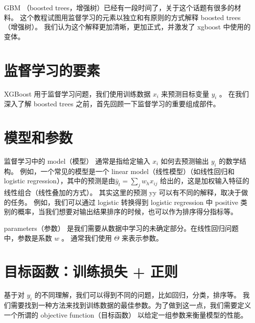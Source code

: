 \documentclass{article}
\begin{document}
GBM （boosted trees，增强树）已经有一段时间了，关于这个话题有很多的材料。 这个教程试图用监督学习的元素以独立和有原则的方式解释 boosted trees （增强树）。 我们认为这个解释更加清晰，更加正式，并激发了 xgboost 中使用的变体。

\section{监督学习的要素}
XGBoost 用于监督学习问题，我们使用训练数据 $x_i$ 来预测目标变量 $y_i$ 。 在我们深入了解 boosted trees 之前，首先回顾一下监督学习的重要组成部件。

\section{模型和参数}
监督学习中的 model（模型） 通常是指给定输入 $x_i$ 如何去预测输出 $y_i$ 的数学结构。 例如，一个常见的模型是一个 linear model（线性模型）（如线性回归和 logistic regression），其中的预测是由$ \hat{y}_t=\sum_j w_hx_{ij}$ 给出的，这是加权输入特征的线性组合（线性叠加的方式）。 其实这里的预测 yy 可以有不同的解释，取决于做的任务。 例如，我们可以通过 logistic 转换得到 logistic regression 中 positive 类别的概率，当我们想要对输出结果排序的时候，也可以作为排序得分指标等。

parameters（参数） 是我们需要从数据中学习的未确定部分。在线性回归问题中，参数是系数 $w$ 。 通常我们使用 $\Theta$ 来表示参数。

\section{目标函数：训练损失 + 正则}
基于对 $y_i$ 的不同理解，我们可以得到不同的问题，比如回归，分类，排序等。 我们需要找到一种方法来找到训练数据的最佳参数。为了做到这一点，我们需要定义一个所谓的 objective function（目标函数） 以给定一组参数来衡量模型的性能。
\end{document}

